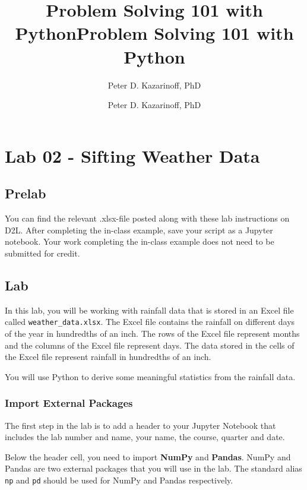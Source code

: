 \documentclass[11pt]{article}
\title{Problem Solving 101 with Python}
\author{Peter D. Kazarinoff, PhD}
\date{}
\title{Problem Solving 101 with Python}
\author{Peter D. Kazarinoff, PhD}
\date{}
\begin{document}
    
    
    

    
    

    
    \hypertarget{lab-02---sifting-weather-data}{%
\section{Lab 02 - Sifting Weather
Data}\label{lab-02---sifting-weather-data}}

    \hypertarget{prelab}{%
\subsection{Prelab}\label{prelab}}

You can find the relevant .xlsx-file posted along with these lab
instructions on D2L. After completing the in-class example, save your
script as a Jupyter notebook. Your work completing the in-class example
does not need to be submitted for credit.

    \hypertarget{lab}{%
\subsection{Lab}\label{lab}}

In this lab, you will be working with rainfall data that is stored in an
Excel file called \texttt{weather\_data.xlsx}. The Excel file contains
the rainfall on different days of the year in hundredths of an inch. The
rows of the Excel file represent months and the columns of the Excel
file represent days. The data stored in the cells of the Excel file
represent rainfall in hundredths of an inch.

You will use Python to derive some meaningful statistics from the
rainfall data.

    \hypertarget{import-external-packages}{%
\subsubsection{Import External
Packages}\label{import-external-packages}}

The first step in the lab is to add a header to your Jupyter Notebook
that includes the lab number and name, your name, the course, quarter
and date.

Below the header cell, you need to import \textbf{NumPy} and
\textbf{Pandas}. NumPy and Pandas are two external packages that you
will use in the lab. The standard alias \texttt{np} and \texttt{pd}
should be used for NumPy and Pandas respectively.
\end{document}
